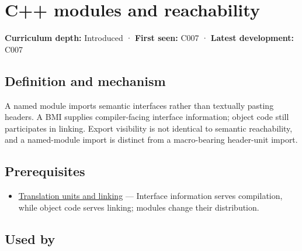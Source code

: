\hypertarget{appendix-410a611a5b8d}{}\label{referencestart:appendix-410a611a5b8d}
\section{C++ modules and reachability}\label{appendix-410a611a5b8d-c-modules-and-reachability}

\hypertarget{appendix-410a611a5b8d-c-modules-and-reachability}{}

\textbf{Curriculum depth:} Introduced · \textbf{First seen:} C007 · \textbf{Latest development:} C007

\begin{allmightroledefinition}

\subsection{Definition and mechanism}\label{appendix-410a611a5b8d-definition-and-mechanism}

\hypertarget{appendix-410a611a5b8d-definition-and-mechanism}{}

A named module imports semantic interfaces rather than textually pasting headers. A BMI supplies compiler-facing interface information; object code still participates in linking. Export visibility is not identical to semantic reachability, and a named-module import is distinct from a macro-bearing header-unit import.

\end{allmightroledefinition}

\subsection{Prerequisites}\label{appendix-410a611a5b8d-prerequisites}

\hypertarget{appendix-410a611a5b8d-prerequisites}{}

\begin{itemize}
\tightlist
\item
  \hyperref[appendix-806686359e1b]{Translation units and linking} --- Interface information serves compilation, while object code serves linking; modules change their distribution.
\end{itemize}

\subsection{Used by}\label{appendix-410a611a5b8d-used-by}

